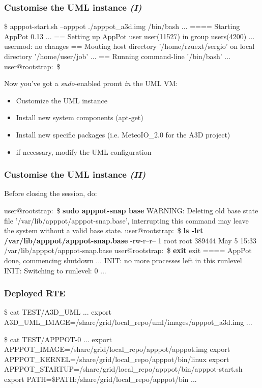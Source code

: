 \documentclass{beamer}
\begin{document}
\begin{frame}[fragile]
  \frametitle{Customise the UML instance \emph{(I)}}
\begin{semiverbatim}
\$ apppot-start.sh --apppot ./apppot\_a3d.img /bin/bash
...
==== Starting AppPot 0.13 ...
== Setting up AppPot user user(11527) in group users(4200) ...
usermod: no changes
== Mouting host directory '/home/rzuext/sergio' on local directory '/home/user/job' ...
== Running command-line '/bin/bash' ...
user@rootstrap:~\$ 
\end{semiverbatim}

Now you've got a \emph{sudo}-enabled promt \emph{in} the UML VM:
\begin{itemize}
  \item Customize the UML instance
  \item Install new system components (apt-get)
  \item Install new specific packages (i.e. MeteoIO\_2.0 for the A3D project)
  \item if necessary, modify the UML configuration
\end{itemize}
\end{frame}

\begin{frame}[fragile]
  \frametitle{Customise the UML instance \emph{(II)}}
Before closing the session, do:
\begin{semiverbatim}
user@rootstrap:~\$ \textbf{sudo apppot-snap base}
WARNING: Deleting old base state file '/var/lib/apppot/apppot-snap.base', interrupting this command may leave the system without a valid base state.
user@rootstrap:~\$ \textbf{ls -lrt /var/lib/apppot/apppot-snap.base}
-rw-r--r-- 1 root root 389444 May  5 15:33 /var/lib/apppot/apppot-snap.base
user@rootstrap:~\$ \textbf{exit}
exit
==== AppPot done, commencing shutdown ...
INIT: no more processes left in this runlevel
INIT: Switching to runlevel: 0
...
\end{semiverbatim}
\end{frame}

\begin{frame}[fragile]
  \frametitle{Deployed RTE}
\begin{semiverbatim}\footnotesize
\$ cat TEST/A3D\_UML
...
export A3D\_UML\_IMAGE=/share/grid/local\_repo/uml/images/apppot\_a3d.img
...
\end{semiverbatim}

\begin{semiverbatim}\footnotesize
\$ cat TEST/APPPOT-0
...
export APPPOT\_IMAGE=/share/grid/local\_repo/apppot/apppot.img
export APPPOT\_KERNEL=/share/grid/local\_repo/apppot/bin/linux
export APPPOT\_STARTUP=/share/grid/local\_repo/apppot/bin/apppot-start.sh
export PATH=\$PATH:/share/grid/local\_repo/apppot/bin
...
\end{semiverbatim}
\end{frame}
\end{document}
